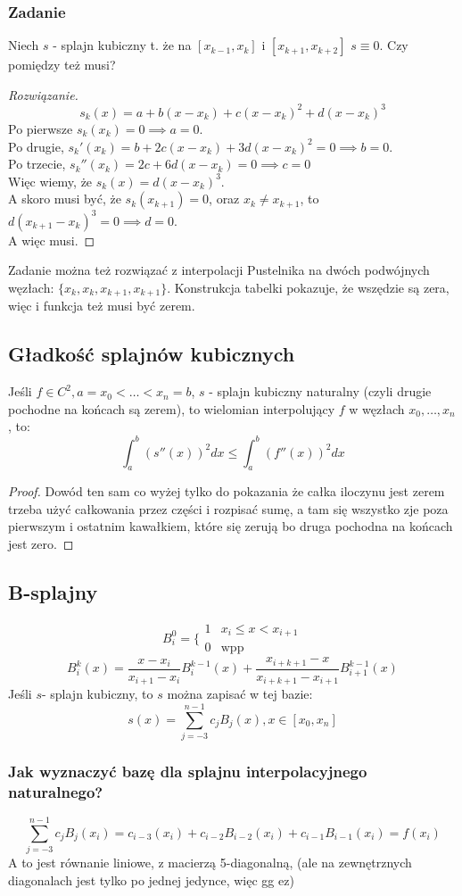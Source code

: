 \documentclass{article}
\begin{document}
\subsubsection{Zadanie}
Niech $ s $ - splajn kubiczny t. że na $ [x_{k-1}, x_k] $ i $ [x_{k+1}, x_{k+2}] $ $ s \equiv0$. Czy pomiędzy też musi?
\begin{proof}[Rozwiązanie]
$$s_k(x)=a+b(x-x_k)+c(x-x_k)^2+d(x-x_k)^3$$
Po pierwsze $ s_k(x_k)=0\implies a=0 $.\\
Po drugie, $ s_k'(x_k)=b+2c(x-x_k)+3d(x-x_k)^2=0\implies b=0 $. \\
Po trzecie, $ s_k''(x_k)=2c+6d(x-x_k)=0\implies c=0 $ \\
Więc wiemy, że $ s_k(x)= d(x-x_k)^3$.\\
A skoro musi być, że $ s_k(x_{k+1})=0$, oraz $ x_k\not=x_{k+1} $, to $ d(x_{k+1}-x_k)^3=0\implies d=0 $.\\
A więc musi.
\end{proof}
Zadanie można też rozwiązać z interpolacji Pustelnika na dwóch podwójnych węzłach: $ \{x_k, x_k, x_{k+1}, x_{k+1}\} $. Konstrukcja tabelki pokazuje, że wszędzie są zera, więc i funkcja też musi być zerem.
\subsection{Gładkość splajnów kubicznych}
Jeśli $ f\in C^2, a=x_0<\dots<x_n=b $, $ s $ - splajn kubiczny naturalny (czyli drugie pochodne na końcach są zerem), to wielomian interpolujący $ f $ w węzłach $ x_0, \dots, x_n $, to:
$$\int_{a}^{b}(s''(x))^2dx\le\int_{a}^{b}(f''(x))^2dx$$
\begin{proof}
Dowód ten sam co wyżej tylko do pokazania że całka iloczynu jest zerem trzeba użyć całkowania przez części i rozpisać sumę, a tam się wszystko zje poza pierwszym i ostatnim kawałkiem, które się zerują bo druga pochodna na końcach jest zero.
\end{proof}
\subsection{B-splajny}
$$B_i^0=\bigg\{\begin{matrix}
1&x_i\le x<x_{i+1}\\
0&\text{wpp}
\end{matrix}$$
$$B^k_i(x)=\frac{x-x_i}{x_{i+1}-x_i}B_i^{k-1}(x)+\frac{x_{i+k+1}-x}{x_{i+k+1}-x_{i+1}}B_{i+1}^{k-1}(x)$$
Jeśli $ s $- splajn kubiczny, to $ s $ można zapisać w tej bazie:
$$s(x)=\sum_{j=-3}^{n-1} c_jB_j(x), x\in[x_0,x_n]$$
\subsubsection{Jak wyznaczyć bazę dla splajnu interpolacyjnego naturalnego?}
$$\sum_{j=-3}^{n-1}c_jB_j(x_i)=c_{i-3}(x_i)+c_{i-2}B_{i-2}(x_i) + c_{i-1}B_{i-1}(x_i)=f(x_i)$$
A to jest równanie liniowe, z macierzą 5-diagonalną, (ale na zewnętrznych diagonalach jest tylko po jednej jedynce, więc gg ez)
\end{document}
